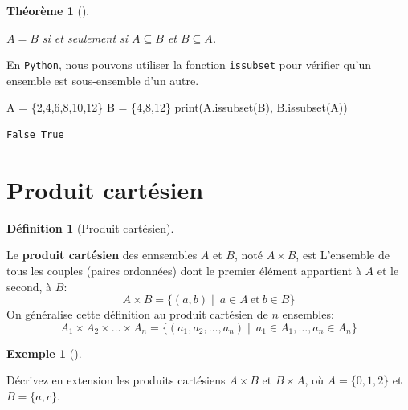 \documentclass[
  letterpaper,
]{scrbook}
\newenvironment{Shaded}{}{}
\newcommand{\BuiltInTok}[1]{#1}
\newcommand{\DecValTok}[1]{\textcolor[rgb]{0.25,0.63,0.44}{#1}}
\newcommand{\NormalTok}[1]{#1}
\newcommand{\OperatorTok}[1]{\textcolor[rgb]{0.40,0.40,0.40}{#1}}
\newcommand{\set}[1]{\{#1\}}
\theoremstyle{definition}
\newtheorem{example}{Exemple}[chapter]
\theoremstyle{definition}
\newtheorem{definition}{Définition}[chapter]
\theoremstyle{plain}
\newtheorem{theorem}{Théorème}[chapter]
\theoremstyle{remark}
\begin{document}
\leavevmode{}%
\begin{theorem}[]\label{thm-sous-ensemble-egalite-ensemble}

\(A=B\) si et seulement si \(A\subseteq B\) et \(B\subseteq A\).

\end{theorem}

En \texttt{Python}, nous pouvons utiliser la fonction \texttt{issubset}
pour vérifier qu'un ensemble est sous-ensemble d'un autre.

\hypertarget{sous-ensemble-verification}{}
\begin{Shaded}
\begin{Highlighting}[]
\NormalTok{A }\OperatorTok{=}\NormalTok{ \{}\DecValTok{2}\NormalTok{,}\DecValTok{4}\NormalTok{,}\DecValTok{6}\NormalTok{,}\DecValTok{8}\NormalTok{,}\DecValTok{10}\NormalTok{,}\DecValTok{12}\NormalTok{\}}
\NormalTok{B }\OperatorTok{=}\NormalTok{ \{}\DecValTok{4}\NormalTok{,}\DecValTok{8}\NormalTok{,}\DecValTok{12}\NormalTok{\}}
\BuiltInTok{print}\NormalTok{(A.issubset(B), B.issubset(A))}
\end{Highlighting}
\end{Shaded}

\begin{verbatim}
False True
\end{verbatim}

\hypertarget{produit-cartuxe9sien}{%
\section{Produit cartésien}\label{produit-cartuxe9sien}}

\leavevmode{}%
\begin{definition}[Produit cartésien]\label{def-produit-cartesien}

Le \textbf{produit cartésien} des ennsembles \(A\) et \(B\), noté
\(A\times B\), est L'ensemble de tous les couples (paires ordonnées)
dont le premier élément appartient à \(A\) et le second, à \(B\): \[
A\times B = \set{(a,b)\mid\ a\in A\ \text{et}\ b\in B}
\] On généralise cette définition au produit cartésien de \(n\)
ensembles: \[
A_1 \times A_2 \times \ldots \times A_n = \set{(a_1,a_2,\ldots,a_n)\mid\ a_1\in A_1,\ldots, a_n\in A_n}
\]

\end{definition}

\leavevmode{}%
\begin{example}[]\label{exm-ensembles-extension-produit-cartesien}

Décrivez en extension les produits cartésiens \(A\times B\) et
\(B\times A\), où \(A=\set{0,1,2}\) et \(B=\set{a,c}\).

\end{example}
\end{document}

